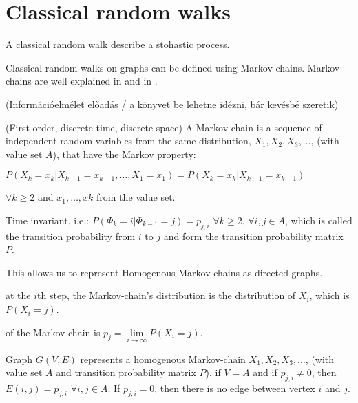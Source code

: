 \section{Classical random walks}

A classical random walk describe a stohastic process.


Classical random walks on graphs can be defined using Markov-chains. Markov-chains
are well explained in \cite{BreimanProbability} and in \cite{XiaReview}.


(Információelmélet előadás / a könyvet be lehetne idézni, bár kevésbé szeretik)

 (First order, discrete-time, discrete-space) A Markov-chain is a sequence of independent random variables from the same distribution, $X_1, X_2, X_3, \dots$, (with value set $A$), that have the Markov property:


$P(X_k = x_k | X_{k-1} = x_{k-1}, \dots, X_1 = x_1) = P(X_k = x_k | X_{k-1} = x_{k-1})$

$\forall k\geq{}2$ and $x_{1},\dots, x{k}$ from the value set.

 Time invariant, i.e.:
$P(\Phi_k = i | \Phi_{k-1} = j) = p_{j,i}$ $\forall k\geq{}2$, $\forall i,j \in{} A$, which is called the transition probability from $i$ to $j$ and form the transition probability matrix $P$.

This allows us to represent Homogenous Markov-chains as directed graphs.

 at the $i$th step, the Markov-chain's distribution is the distribution of $X_i$, which is $P(X_i = j)$.

 of the Markov chain is $p_{j} = \lim\limits_{i \to \infty} P(X_i = j)$.

Graph $G(V,E)$ represents a homogenous Markov-chain $X_1, X_2, X_3, \dots$, (with value set $A$ and transition probability matrix $P$), if $V=A$ and if $p_{j,i} \neq{} 0$, then $E(i,j) = p_{j,i}$ $\forall{}i,j\in{}A$. If $p_{j,i} = 0$, then there is no edge between vertex $i$ and $j$.

